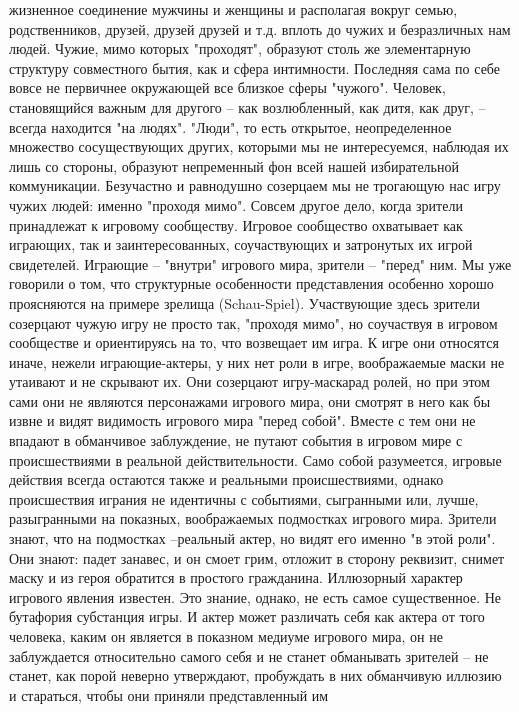\documentclass[12pt]{article}
\begin{document}
жизненное соединение мужчины и женщины и располагая вокруг семью, родственников, друзей, друзей друзей
и т.д.  вплоть  до чужих и безразличных нам  людей.  Чужие,  мимо которых "проходят", образуют  столь же
элементарную  структуру  совместного  бытия,  как  и  сфера  интимности.  Последняя  сама  по  себе  вовсе  не
первичнее  окружающей  все  близкое  сферы  "чужого".  Человек,  становящийся  важным  для  другого  --  как
возлюбленный, как дитя, как друг, -- всегда находится "на людях". "Люди", то есть открытое, неопределенное
множество сосуществующих других, которыми мы не интересуемся, наблюдая их лишь со стороны, образуют
непременный  фон  всей  нашей  избирательной  коммуникации.  Безучастно  и  равнодушно  созерцаем  мы  не
трогающую нас игру чужих людей: именно "проходя мимо".
Совсем другое дело, когда зрители принадлежат к игровому сообществу. Игровое сообщество охватывает как
играющих, так и заинтересованных, соучаствующих и затронутых их игрой свидетелей. Играющие -- "внутри"
игрового мира, зрители -- "перед" ним. Мы уже говорили о том, что структурные особенности представления
особенно  хорошо  проясняются  на  примере  зрелища  (Schau-Spiel).  Участвующие  здесь  зрители  созерцают
чужую игру не просто так, "проходя мимо", но соучаствуя в игровом сообществе и ориентируясь на то, что
возвещает им игра. К игре они относятся иначе, нежели играющие-актеры, у них нет роли в игре, воображаемые
маски не утаивают и не скрывают их. Они созерцают игру-маскарад ролей, но при этом сами они не являются
персонажами игрового мира, они смотрят в него как бы извне и видят видимость игрового мира "перед собой".
Вместе с тем они не впадают в обманчивое заблуждение, не путают события в игровом мире с происшествиями
в реальной действительности. Само собой разумеется, игровые действия всегда остаются также и реальными
происшествиями,  однако  происшествия  играния  не  идентичны  с  событиями,  сыгранными  или,  лучше,
разыгранными на показных, воображаемых подмостках игрового мира. Зрители знают, что на подмостках --реальный актер, но видят его именно "в этой роли". Они знают: падет занавес, и он смоет грим, отложит в
сторону реквизит, снимет маску и из героя обратится в простого гражданина. Иллюзорный характер игрового
явления известен. Это знание, однако, не есть самое существенное. Не бутафория субстанция игры. И актер
может различать себя как актера от того человека, каким он является в показном медиуме игрового мира, он не
заблуждается относительно самого себя и не станет обманывать зрителей -- не станет, как порой неверно
утверждают, пробуждать в них обманчивую иллюзию и стараться, чтобы они приняли представленный им
\end{document}
